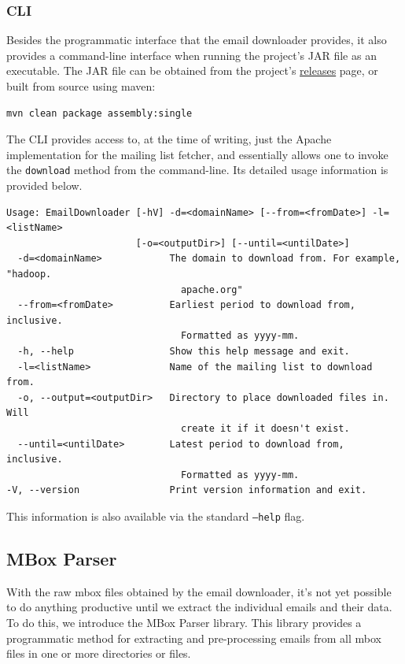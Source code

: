 \documentclass[a4paper, 12pt]{article}
\begin{document}
		\subsubsection{CLI}
			Besides the programmatic interface that the email downloader provides, it also provides a command-line interface when running the project's JAR file as an executable. The JAR file can be obtained from the project's \href{https://github.com/ArchitecturalKnowledgeAnalysis/EmailDownloader/releases}{releases} page, or built from source using maven:
			
			\begin{verbatim}
mvn clean package assembly:single
			\end{verbatim}
		
			The CLI provides access to, at the time of writing, just the Apache implementation for the mailing list fetcher, and essentially allows one to invoke the \texttt{download} method from the command-line. Its detailed usage information is provided below.
			
			\begin{verbatim}
Usage: EmailDownloader [-hV] -d=<domainName> [--from=<fromDate>] -l=<listName>
                       [-o=<outputDir>] [--until=<untilDate>]
  -d=<domainName>            The domain to download from. For example, "hadoop.
                               apache.org"
  --from=<fromDate>          Earliest period to download from, inclusive.
                               Formatted as yyyy-mm.
  -h, --help                 Show this help message and exit.
  -l=<listName>              Name of the mailing list to download from.
  -o, --output=<outputDir>   Directory to place downloaded files in. Will
                               create it if it doesn't exist.
  --until=<untilDate>        Latest period to download from, inclusive.
                               Formatted as yyyy-mm.
-V, --version                Print version information and exit.
			\end{verbatim}
		
			This information is also available via the standard \texttt{--help} flag.
	
	\subsection{MBox Parser}
		With the raw mbox files obtained by the email downloader, it's not yet possible to do anything productive until we extract the individual emails and their data. To do this, we introduce the MBox Parser library. This library provides a programmatic method for extracting and pre-processing emails from all mbox files in one or more directories or files.
		
\end{document}

